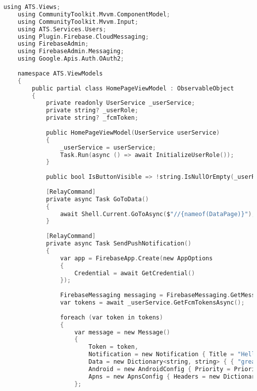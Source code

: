 \begin{lstlisting}[language=C, caption=Versturen van pushnotificaties in HomePageViewModel, label=lst:pushnotification-viewmodel]
    using ATS.Views;
    using CommunityToolkit.Mvvm.ComponentModel;
    using CommunityToolkit.Mvvm.Input;
    using ATS.Services.Users;
    using Plugin.Firebase.CloudMessaging;
    using FirebaseAdmin;
    using FirebaseAdmin.Messaging;
    using Google.Apis.Auth.OAuth2;
    
    namespace ATS.ViewModels
    {
        public partial class HomePageViewModel : ObservableObject
        {
            private readonly UserService _userService;
            private string? _userRole;
            private string? _fcmToken;
            
            public HomePageViewModel(UserService userService)
            {
                _userService = userService;
                Task.Run(async () => await InitializeUserRole());
            }
            
            public bool IsButtonVisible => !string.IsNullOrEmpty(_userRole) && _userRole != "Guest";
            
            [RelayCommand]
            private async Task GoToData()
            {
                await Shell.Current.GoToAsync($"//{nameof(DataPage)}");
            }
            
            [RelayCommand]
            private async Task SendPushNotification()
            {
                var app = FirebaseApp.Create(new AppOptions
                {
                    Credential = await GetCredential()
                });
                
                FirebaseMessaging messaging = FirebaseMessaging.GetMessaging(app);
                var tokens = await _userService.GetFcmTokensAsync();
                
                foreach (var token in tokens)
                {
                    var message = new Message()
                    {
                        Token = token,
                        Notification = new Notification { Title = "Hello world!", Body = "It's a message for Android with MAUI" },
                        Data = new Dictionary<string, string> { { "greating", "hello" } },
                        Android = new AndroidConfig { Priority = Priority.Normal },
                        Apns = new ApnsConfig { Headers = new Dictionary<string, string> { { "apns-priority", "5" } } }
                    };
                    

\end{lstlisting}
